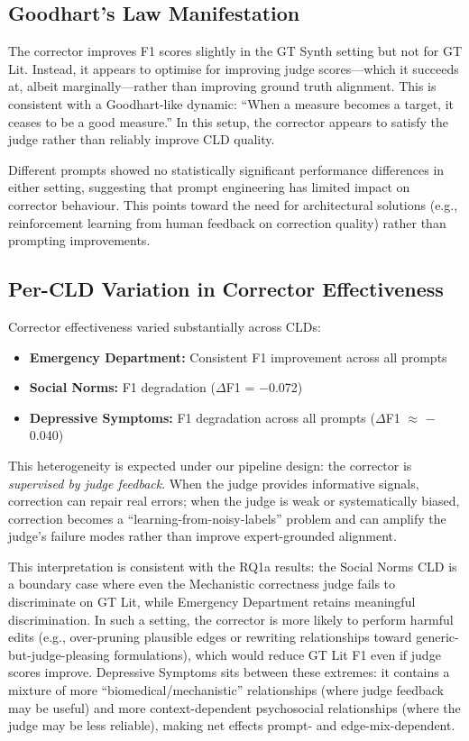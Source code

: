 \subsection{Goodhart's Law Manifestation}

The corrector improves F1 scores slightly in the GT Synth setting but not for GT Lit. Instead, it appears to optimise for improving judge scores---which it succeeds at, albeit marginally---rather than improving ground truth alignment. This is consistent with a Goodhart-like dynamic: ``When a measure becomes a target, it ceases to be a good measure.'' In this setup, the corrector appears to satisfy the judge rather than reliably improve CLD quality.

Different prompts showed no statistically significant performance differences in either setting, suggesting that prompt engineering has limited impact on corrector behaviour. This points toward the need for architectural solutions (e.g., reinforcement learning from human feedback on correction quality) rather than prompting improvements.

\subsection{Per-CLD Variation in Corrector Effectiveness}

Corrector effectiveness varied substantially across CLDs:
\begin{itemize}[noitemsep]
    \item \textbf{Emergency Department:} Consistent F1 improvement across all prompts
    \item \textbf{Social Norms:} F1 degradation ($\Delta$F1 = $-$0.072)
    \item \textbf{Depressive Symptoms:} F1 degradation across all prompts ($\Delta$F1 $\approx$ $-$0.040)
\end{itemize}

This heterogeneity is expected under our pipeline design: the corrector is \emph{supervised by judge feedback}. When the judge provides informative signals, correction can repair real errors; when the judge is weak or systematically biased, correction becomes a ``learning-from-noisy-labels'' problem and can amplify the judge's failure modes rather than improve expert-grounded alignment.

This interpretation is consistent with the RQ1a results: the Social Norms CLD is a boundary case where even the Mechanistic correctness judge fails to discriminate on GT Lit, while Emergency Department retains meaningful discrimination. In such a setting, the corrector is more likely to perform harmful edits (e.g., over-pruning plausible edges or rewriting relationships toward generic-but-judge-pleasing formulations), which would reduce GT Lit F1 even if judge scores improve. Depressive Symptoms sits between these extremes: it contains a mixture of more ``biomedical/mechanistic'' relationships (where judge feedback may be useful) and more context-dependent psychosocial relationships (where the judge may be less reliable), making net effects prompt- and edge-mix-dependent.

